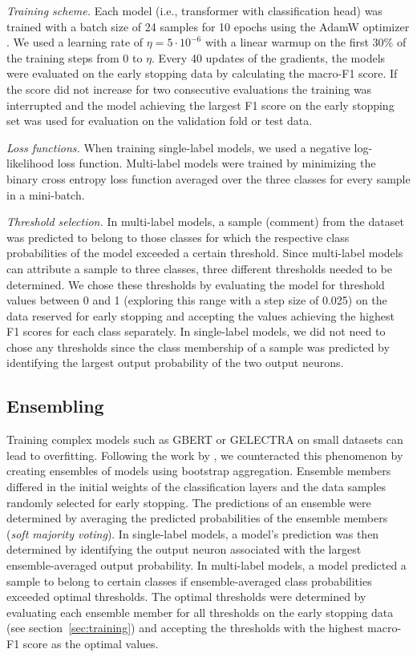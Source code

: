 \documentclass[11pt,a4paper]{article}
\begin{document}
\emph{Training scheme.} Each model (i.e., transformer with classification head) was trained with a batch size of 24 samples for 10 epochs using the AdamW optimizer \cite{Loshchilov2019}.
We used a learning rate of $\eta=5\cdot 10^{-6}$ with a linear warmup on the first 30\% of the training steps from $0$ to $\eta$.
Every 40 updates of the gradients, the models were evaluated on the early stopping data by calculating the macro-F1 score.
If the score did not increase for two consecutive evaluations the training was interrupted and the model achieving the largest F1 score on the early stopping set was used for evaluation on the validation fold or test data.

\emph{Loss functions.} When training single-label models, we used a negative log-likelihood loss function.
Multi-label models were trained by minimizing the binary cross entropy loss function averaged over the three classes for every sample in a mini-batch.

\emph{Threshold selection.} In multi-label models, a sample (comment) from the dataset was predicted to belong to those classes for which the respective class probabilities of the model exceeded a certain threshold.
Since multi-label models can attribute a sample to three classes, three different thresholds needed to be determined.
We chose these thresholds by evaluating the model for threshold values between 0 and 1 (exploring this range with a step size of 0.025) on the data reserved for early stopping and accepting the values achieving the highest F1 scores for each class separately.
In single-label models, we did not need to chose any thresholds since the class membership of a sample was predicted by identifying the largest output probability of the two output neurons.


\subsection{Ensembling}
\label{ssec:ensembling}

Training complex models such as GBERT or GELECTRA on small datasets can lead to overfitting.
Following the work by \citet{Risch2020}, we counteracted this phenomenon by creating ensembles of models using bootstrap aggregation.
Ensemble members differed in the initial weights of the classification layers and the data samples randomly selected for early stopping.
The predictions of an ensemble were determined by averaging the predicted probabilities of the ensemble members (\emph{soft majority voting}).
In single-label models, a model's prediction was then determined by identifying the output neuron associated with the largest ensemble-averaged output probability.
In multi-label models, a model predicted a sample to belong to certain classes if ensemble-averaged class probabilities exceeded optimal thresholds.
The optimal thresholds were determined by evaluating each ensemble member for all thresholds on the early stopping data (see section~\ref{sec:training}) and accepting the thresholds with the highest macro-F1 score as the optimal values.
\end{document}
